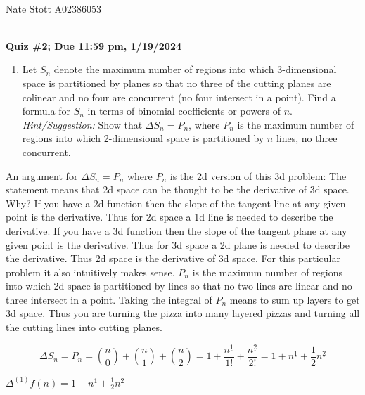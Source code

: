 \documentclass[10pt, AMS Euler]{article}
\begin{document}
	
	\\
    Nate Stott A02386053
	
	\noindent \underline{\hspace{2in}}\\
	
	{\bf Quiz \#2; Due 11:59 pm, 1/19/2024}\\

        \newpage
    	\begin{enumerate}
		\item Let $S_n$ denote the maximum number of regions into which  3-dimensional space is partitioned by planes so that no three of the cutting planes are colinear and no four are concurrent (no four intersect in a point).  Find a formula for $S_n$ in terms of binomial coefficients or powers of $n$.
		\emph{Hint/Suggestion:} Show that $\Delta S_n = P_n$, where $P_n$ is the maximum number of regions into which 2-dimensional space is partitioned by $n$ lines, no three concurrent.
        \end{enumerate}

            An argument for $ \Delta S_n = P_n  $ where $P_n$ is the 2d version of this 3d problem: The statement means that 2d space can be thought to be the derivative of 3d space. Why? If you have a 2d function then the slope of the tangent line at any given point is the derivative. Thus for 2d space a 1d line is needed to describe the derivative. If you have a 3d function then the slope of the tangent plane at any given point is the derivative. Thus for 3d space a 2d plane is needed to describe the derivative. Thus 2d space is the derivative of 3d space. For this particular problem it also intuitively makes sense. $P_n$ is the maximum number of regions into which 2d space is partitioned by lines so that no two lines are linear and no three intersect in a point. Taking the integral of $P_n$ means to sum up layers to get 3d space. Thus you are turning the pizza into many layered pizzas and turning all the cutting lines into cutting planes.
            
            $$\Delta S_n = P_n = \binom{n}{0} + \binom{n}{1} + \binom{n}{2} = 1 + \frac{n^{\underline{1}}}{1!} + \frac{n^{\underline{2}}}{2!} = 1 + n^{\underline{1}} + \frac{1}{2}n^{\underline{2}}$$

            $\Delta^{(1)} f(n) = 1 + n^{\underline{1}} + \frac{1}{2}n^{\underline{2}}$
\end{document}
